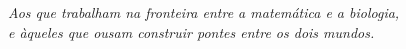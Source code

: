 \begingroup
\thispagestyle{empty}
\vspace*{\fill}
\begin{flushright}
  \textit{Aos que trabalham na fronteira entre a matemática e a biologia,\\
  e àqueles que ousam construir pontes entre os dois mundos.}
\end{flushright}
\vspace*{\fill}
\endgroup
